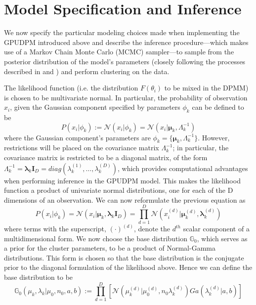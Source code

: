 \documentclass{article}
\begin{document}
\section{Model Specification and Inference}

We now specify the particular modeling choices made when implementing the GPUDPM introduced above and describe the inference procedure---which makes use of a Markov Chain Monte Carlo (MCMC) sampler---to sample from the posterior distribution of the model's parameters (closely following the processes described in \cite{Gasthaus2008} and \cite{Gasthaus_thesis}) and perform clustering on the data.

The likelihood function (i.e. the distribution $F(\theta_{i})$ to be mixed in the DPMM) is chosen to be multivariate normal. In particular, the probability of observation $x_{i}$, given the Gaussian component specified by parameters $\phi_{k}$ can be defined to be
\begin{equation}
P(x_{i}|\phi_{k}) := \mathcal{N}(x_{i}|\phi_{k}) = \mathcal{N}(x_{i}|\mathbf{\mu}_{k}, \Lambda_{k}^{-1})
\end{equation}
where the Gaussian component's parameters are $\phi_{k} = \{ \mathbf{\mu}_{k}, \Lambda_{k}^{-1} \}$. However, restrictions will be placed on the covariance matrix $\Lambda_{k}^{-1}$;  in particular, the covariance matrix is restricted to be a diagonal matrix, of the form $\Lambda_{k}^{-1} = \mathbf{\lambda}_{k}\mathbf{I}_{D} = diag(\lambda_{k}^{(1)}, \ldots, \lambda_{k}^{(D)})$, which provides computational advantages when performing inference in the GPUDPM model. This makes the likelihood function a product of univariate normal distributions, one for each of the D dimensions of an observation. We can now reformulate the previous equation as
\begin{equation}
P(x_{i}|\phi_{k}) = \mathcal{N}(x_{i}|\mathbf{\mu}_{k}, \mathbf{\lambda}_{k}\mathbf{I}_{D}) = \prod_{d=1}^{D} \mathcal{N}(x_{i}^{(d)}|\mathbf{\mu}_{k}^{(d)}, \mathbf{\lambda}_{k}^{(d)})
\end{equation}
where terms with the superscript, $(\cdot)^{(d)}$, denote the $d^{th}$ scalar component of a multidimensional form. We now choose the base distribution $\mathbb{G}_{0}$, which serves as a prior for the cluster parameters, to be a product of Normal-Gamma distributions. This form is chosen so that the base distribution is the conjugate prior to the diagonal formulation of the likelihood above. Hence we can define the base distribution to be
\begin{equation}
\mathbb{G}_{0}(\mu_{k}, \lambda_{k} | \mu_{0}, n_{0}, a, b) := \prod_{d=1}^{D}[\mathcal{N}(\mu_{k}^{(d)} | \mu_{0}^{(d)}, n_{0} \lambda_{k}^{(d)})   Ga(\lambda_{k}^{(d)} | a,b)]
\end{equation}
\end{document}
